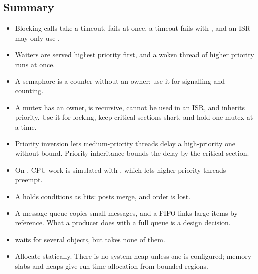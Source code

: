 \subsection{Summary}
\begin{itemize}
  \item Blocking calls take a timeout.  fails at once, a timeout fails with ,
    and an ISR may only use .
  \item Waiters are served highest priority first, and a woken thread of higher priority runs at once.
  \item A semaphore is a counter without an owner: use it for signalling and counting.
  \item A mutex has an owner, is recursive, cannot be used in an ISR, and inherits priority. Use it for
    locking, keep critical sections short, and hold one mutex at a time.
  \item Priority inversion lets medium-priority threads delay a high-priority one without bound. Priority
    inheritance bounds the delay by the critical section.
  \item On , CPU work is simulated with , which lets higher-priority
    threads preempt.
  \item A  holds conditions as bits: posts merge, and order is lost.
  \item A message queue copies small messages, and a FIFO links large items by reference. What a producer
    does with a full queue is a design decision.
  \item {} waits for several objects, but takes none of them.
  \item Allocate statically. There is no system heap unless one is configured; memory slabs and heaps give
    run-time allocation from bounded regions.
\end{itemize}
